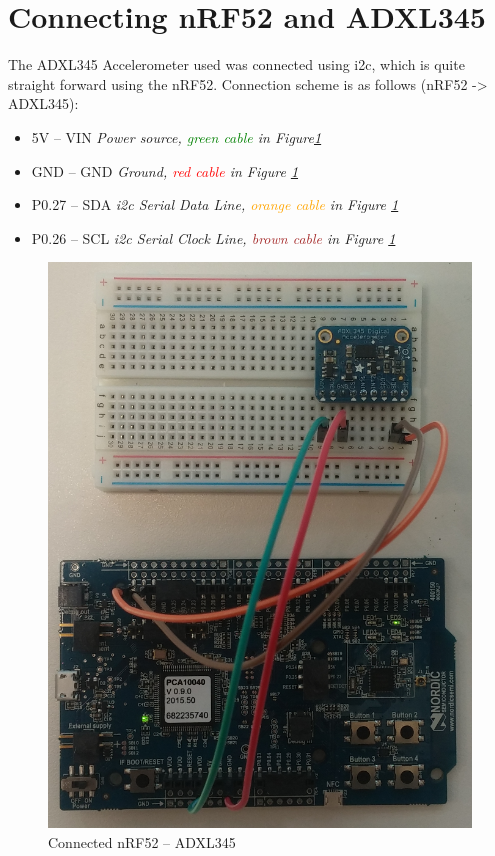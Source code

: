 \section{Connecting nRF52 and ADXL345}

The ADXL345 Accelerometer used was connected using \gls{i2c}, which is quite straight forward using the nRF52. Connection scheme is as follows (nRF52 -> ADXL345): 

\begin{itemize}
  \item 5V -- VIN		\tab  	\textit{Power source, \textcolor{green}{green cable} in Figure\ref{fig:nrf-adxl345}}
  \item GND -- GND 		\tab 	\textit{Ground, \textcolor{red}{red cable} in Figure \ref{fig:nrf-adxl345}}
  \item P0.27 -- SDA	\tab	\textit{\gls{i2c} Serial Data Line, \textcolor{orange}{orange cable} in Figure \ref{fig:nrf-adxl345}}
  \item P0.26 -- SCL	\tab 	\textit{\gls{i2c} Serial Clock Line, \textcolor{brown}{brown cable} in Figure \ref{fig:nrf-adxl345}}
\end{itemize} 

\begin{figure}[ht]
    \centering
    \includegraphics[scale=0.35]{nrf-adxl.png}    \caption{Connected nRF52 -- ADXL345}
    \label{fig:nrf-adxl345}
\end{figure}


